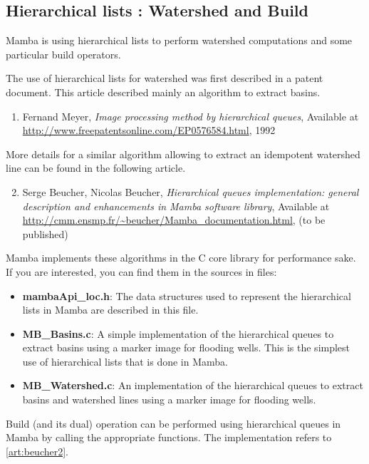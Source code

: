 \documentclass[a4paper,10pt,oneside]{article}
\begin{document}
\subsection{Hierarchical lists : Watershed and Build}

Mamba is using hierarchical lists to perform watershed computations and some
particular build operators.

The use of hierarchical lists for watershed was first described in a patent 
document. This article described mainly an algorithm to extract basins.

\begin{enumerate}
\setcounter{enumi}{0}
\item \label{art:meyer} Fernand Meyer,
\emph{Image processing method by hierarchical queues},
Available at \url{http://www.freepatentsonline.com/EP0576584.html}, 1992
\end{enumerate}

More details for a similar algorithm allowing to extract an idempotent 
watershed line can be found in the following article.

\begin{enumerate}
\setcounter{enumi}{1}
\item \label{art:beucher2} Serge Beucher, Nicolas Beucher,
\emph{Hierarchical queues implementation: general description and enhancements
in Mamba software library},
Available at \url{http://cmm.ensmp.fr/\~beucher/Mamba\_documentation.html},
(to be published)
\end{enumerate}

Mamba implements these algorithms in the C core library for performance sake.
If you are interested, you can find them in the sources in files:

\begin{itemize}
\item \textbf{mambaApi\_loc.h}: The data structures used to represent the 
hierarchical lists in Mamba are described in this file.
\item \textbf{MB\_Basins.c}: A simple implementation of the hierarchical queues
to extract basins using a marker image for flooding wells. This is the simplest
use of hierarchical lists that is done in Mamba.
\item \textbf{MB\_Watershed.c}: An implementation of the hierarchical queues to
extract basins and watershed lines using a marker image for flooding wells.
\end{itemize}

Build (and its dual) operation can be performed using hierarchical queues in
Mamba by calling the appropriate functions. The implementation refers to
\ref{art:beucher2}.
\end{document}
